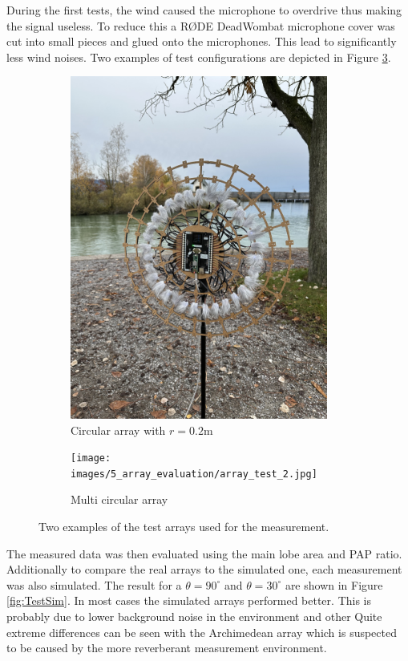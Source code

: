 During the first tests, the wind caused the microphone to overdrive
thus making the signal useless.
To reduce this a RØDE DeadWombat microphone cover was cut into small pieces
and glued onto the microphones.
This lead to significantly less wind noises.
Two examples of test configurations are depicted in Figure \ref{fig:testSetup}.
\begin{figure}[ht]
	\centering
	\begin{subfigure}[b]{0.49\textwidth}
		\centering
		\includegraphics[width=0.93\textwidth]{images/5_array_evaluation/array_test_1.jpg}
		\caption{Circular array with $r=0.2$m}
		\label{fig:array_test_1}
	\end{subfigure}
	\begin{subfigure}[b]{0.49\textwidth}
		\centering
		\texttt{[image: images/5\_array\_evaluation/array\_test\_2.jpg]}
		\caption{Multi circular array}
		\label{fig:array_test_2}
	\end{subfigure}
	\caption{Two examples of the test arrays used for the measurement.}
	\label{fig:testSetup}
\end{figure}
The measured data was then evaluated using the main lobe area and PAP ratio.
Additionally to compare the real arrays to the simulated one, each measurement
was also simulated.
The result for a $\theta = 90^\circ$ and $\theta = 30^\circ$ are shown in
Figure \ref{fig:TestSim}.
In most cases the simulated arrays performed better.
This is probably due to lower background noise in the environment and other
Quite extreme differences can be seen with the Archimedean array which is
suspected to be caused by the more reverberant measurement environment.


